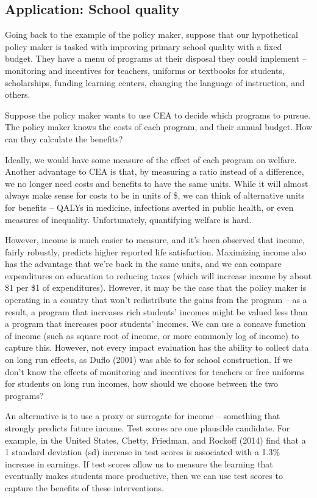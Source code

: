 \documentclass[12pt,english]{article}
\begin{document}
\subsection{Application: School quality}

Going back to the example of the policy maker, suppose that our hypothetical policy maker is tasked with improving primary school quality with a fixed budget. They have a menu of programs at their disposal they could implement -- monitoring and incentives for teachers, uniforms or textbooks for students, scholarships, funding learning centers, changing the language of instruction, and others.

Suppose the policy maker wants to use CEA to decide which programs to pursue. The policy maker knows the costs of each program, and their annual budget. How can they calculate the benefits?

Ideally, we would have some measure of the effect of each program on welfare. Another advantage to CEA is that, by measuring a ratio instead of a difference, we no longer need costs and benefits to have the same units. While it will almost always make sense for costs to be in units of \$, we can think of alternative units for benefits -- QALYs in medicine, infections averted in public health, or even measures of inequality. Unfortunately, quantifying welfare is hard.

However, income is much easier to measure, and it's been observed that income, fairly robustly, predicts higher reported life satisfaction. Maximizing income also has the advantage that we're back in the same units, and we can compare expenditures on education to reducing taxes (which will increase income by about \$1 per \$1 of expenditures). However, it may be the case that the policy maker is operating in a country that won't redistribute the gains from the program -- as a result, a program that increases rich students' incomes might be valued less than a program that increases poor students' incomes. We can use a concave function of income (such as square root of income, or more commonly log of income) to capture this. However, not every impact evaluation has the ability to collect data on long run effects, as Duflo (2001) was able to for school construction. If we don't know the effects of monitoring and incentives for teachers or free uniforms for students on long run incomes, how should we choose between the two programs?

An alternative is to use a proxy or surrogate for income -- something that strongly predicts future income. Test scores are one plausible candidate. For example, in the United States, Chetty, Friedman, and Rockoff (2014) find that a 1 standard deviation (sd) increase in test scores is associated with a 1.3\% increase in earnings. If test scores allow us to measure the learning that eventually makes students more productive, then we can use test scores to capture the benefits of these interventions.
\end{document}
